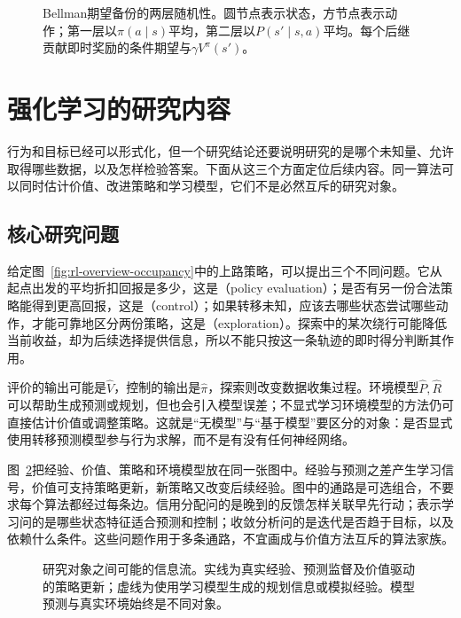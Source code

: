 \begin{figure}[htbp]
  \centering
  
  \caption{Bellman期望备份的两层随机性。圆节点表示状态，方节点表示动作；第一层以$\pi(a\mid s)$平均，第二层以$P(s'\mid s,a)$平均。每个后继贡献即时奖励的条件期望与$\gamma V^\pi(s')$。}
  \label{fig:rl-overview-backup}
\end{figure}

\section{强化学习的研究内容}
\label{sec:rl-overview-research}

行为和目标已经可以形式化，但一个研究结论还要说明研究的是哪个未知量、允许取得哪些数据，以及怎样检验答案。下面从这三个方面定位后续内容。同一算法可以同时估计价值、改进策略和学习模型，它们不是必然互斥的研究对象。

\subsection{核心研究问题}
\label{sec:rl-overview-questions}

给定图~\ref{fig:rl-overview-occupancy}中的上路策略，可以提出三个不同问题。它从起点出发的平均折扣回报是多少，这是（policy evaluation）；是否有另一份合法策略能得到更高回报，这是（control）；如果转移未知，应该去哪些状态尝试哪些动作，才能可靠地区分两份策略，这是（exploration）。探索中的某次绕行可能降低当前收益，却为后续选择提供信息，所以不能只按这一条轨迹的即时得分判断其作用。

评价的输出可能是$\widehat V$，控制的输出是$\widehat\pi$，探索则改变数据收集过程。环境模型$\widehat P,\widehat R$可以帮助生成预测或规划，但也会引入模型误差；不显式学习环境模型的方法仍可直接估计价值或调整策略。这就是“无模型”与“基于模型”要区分的对象：是否显式使用转移预测模型参与行为求解，而不是有没有任何神经网络。

图~\ref{fig:rl-overview-research-flow}把经验、价值、策略和环境模型放在同一张图中。经验与预测之差产生学习信号，价值可支持策略更新，新策略又改变后续经验。图中的通路是可选组合，不要求每个算法都经过每条边。信用分配问的是晚到的反馈怎样关联早先行动；表示学习问的是哪些状态特征适合预测和控制；收敛分析问的是迭代是否趋于目标，以及依赖什么条件。这些问题作用于多条通路，不宜画成与价值方法互斥的算法家族。

\begin{figure}[htbp]
  \centering
  
  \caption{研究对象之间可能的信息流。实线为真实经验、预测监督及价值驱动的策略更新；虚线为使用学习模型生成的规划信息或模拟经验。模型预测与真实环境始终是不同对象。}
  \label{fig:rl-overview-research-flow}
\end{figure}

